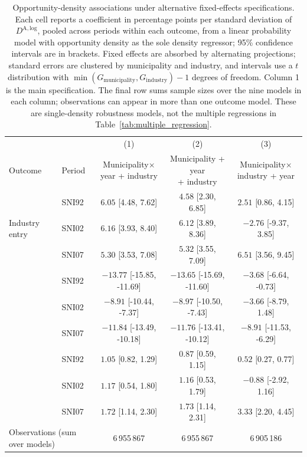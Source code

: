 \documentclass[9pt,twoside]{pnas-new}
\begin{document}
\clearpage
\begin{table}[H]
\centering
\small
\setlength{\tabcolsep}{4pt}
\caption{Opportunity-density associations under alternative fixed-effects specifications. Each cell reports a coefficient in percentage points per standard deviation of $D^{\mathrm{A,log}}$, pooled across periods within each outcome, from a linear probability model with opportunity density as the sole density regressor; 95\% confidence intervals are in brackets. Fixed effects are absorbed by alternating projections; standard errors are clustered by municipality and industry, and intervals use a $t$ distribution with $\min(G_{\mathrm{municipality}},G_{\mathrm{industry}})-1$ degrees of freedom. Column 1 is the main specification. The final row sums sample sizes over the nine models in each column; observations can appear in more than one outcome model. These are single-density robustness models, not the multiple regressions in Table~\ref{tab:multiple_regression}.}
\label{tab:fe_robustness}
\begin{tabular}{llccc}
\toprule
 & & (1) & (2) & (3) \\
Outcome & Period & \shortstack{Municipality$\times$year\\+ industry} & \shortstack{Municipality + year\\+ industry} & \shortstack{Municipality$\times$industry\\+ year} \\
\midrule
\multirow{3}{*}{Industry entry} & SNI92 & $\mathbf{6.05}$ [4.48, 7.62] & $4.58$ [2.30, 6.85] & $2.51$ [0.86, 4.15] \\
 & SNI02 & $\mathbf{6.16}$ [3.93, 8.40] & $6.12$ [3.89, 8.36] & $-2.76$ [-9.37, 3.85] \\
 & SNI07 & $\mathbf{5.30}$ [3.53, 7.08] & $5.32$ [3.55, 7.09] & $6.51$ [3.56, 9.45] \\
\addlinespace
\multirow{3}{*}{Industry exit} & SNI92 & $\mathbf{-13.77}$ [-15.85, -11.69] & $-13.65$ [-15.69, -11.60] & $-3.68$ [-6.64, -0.73] \\
 & SNI02 & $\mathbf{-8.91}$ [-10.44, -7.37] & $-8.97$ [-10.50, -7.43] & $-3.66$ [-8.79, 1.48] \\
 & SNI07 & $\mathbf{-11.84}$ [-13.49, -10.18] & $-11.76$ [-13.41, -10.12] & $-8.91$ [-11.53, -6.29] \\
\addlinespace
\multirow{3}{*}{Startup formation} & SNI92 & $\mathbf{1.05}$ [0.82, 1.29] & $0.87$ [0.59, 1.15] & $0.52$ [0.27, 0.77] \\
 & SNI02 & $\mathbf{1.17}$ [0.54, 1.80] & $1.16$ [0.53, 1.79] & $-0.88$ [-2.92, 1.16] \\
 & SNI07 & $\mathbf{1.72}$ [1.14, 2.30] & $1.73$ [1.14, 2.31] & $3.33$ [2.20, 4.45] \\
\midrule
\multicolumn{2}{l}{Observations (sum over models)} & 6\,955\,867 & 6\,955\,867 & 6\,905\,186 \\
\bottomrule
\end{tabular}
\end{table}
\end{document}
